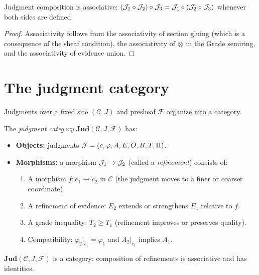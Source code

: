 \begin{proposition}
\label{prop:composition-assoc}
Judgment composition is associative: $(\mathcal{J}_1 \circ \mathcal{J}_2) \circ \mathcal{J}_3
= \mathcal{J}_1 \circ (\mathcal{J}_2 \circ \mathcal{J}_3)$ whenever both sides are defined.
\end{proposition}

\begin{proof}
Associativity follows from the associativity of section gluing (which
is a consequence of the sheaf condition), the associativity of $\otimes$
in the Grade semiring, and the associativity of evidence union.
\end{proof}


\section{The judgment category}
\label{sec:judgment:category}

Judgments over a fixed site $(\mathcal{C}, J)$ and presheaf
$\mathcal{F}$ organize into a category.

\begin{definition}
\label{def:judgment-category}
The \emph{judgment category} $\mathbf{Jud}(\mathcal{C}, J, \mathcal{F})$
has:
\begin{itemize}
\item \textbf{Objects:} judgments
  $\mathcal{J} = (c, \varphi, A, E, O, B, T, \Pi)$.

\item \textbf{Morphisms:} a morphism $\mathcal{J}_1 \to \mathcal{J}_2$ (called a
  \emph{refinement}) consists of:
  \begin{enumerate}[nosep,label=(\alph*)]
  \item A morphism $f : c_1 \to c_2$ in $\mathcal{C}$ (the judgment
    moves to a finer or coarser coordinate).
  \item A refinement of evidence: $E_2$ extends or strengthens $E_1$
    relative to $f$.
  \item A grade inequality: $T_2 \geq T_1$ (refinement improves or
    preserves quality).
  \item Compatibility: $\varphi_2|_{c_1} = \varphi_1$ and
    $A_2|_{c_1}$ implies $A_1$.
  \end{enumerate}
\end{itemize}
\end{definition}

\begin{proposition}
\label{prop:judgment-cat-welldef}
$\mathbf{Jud}(\mathcal{C}, J, \mathcal{F})$ is a category: composition
of refinements is associative and has identities.
\end{proposition}

